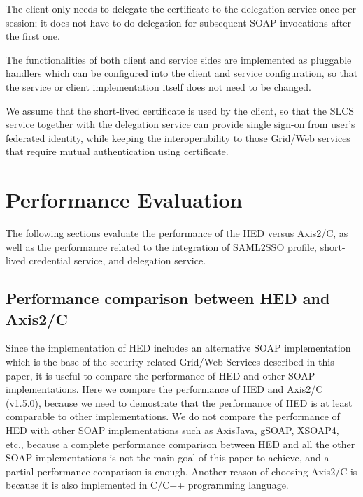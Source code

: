 \documentclass[conference]{IEEEtran}
\begin{document}
The client only needs to delegate the certificate to the delegation service once
per session; it does not have to do delegation for subsequent SOAP invocations after the first one.

The functionalities of both client and service sides are implemented as
pluggable handlers which can be configured into the client and service configuration, so that the service or
client implementation itself does not need to be changed.

We assume that the short-lived certificate is used by the client, so that the
SLCS service together with the delegation service can provide single sign-on from user's federated
identity, while keeping the interoperability to those Grid/Web services that require mutual authentication
using certificate.

\section{Performance Evaluation}
\label{sec:perfeval}
The following sections evaluate the performance of the HED versus Axis2/C, as 
well as the performance related to the integration of SAML2SSO profile, 
short-lived credential service, and delegation service.

\subsection{Performance comparison between HED and Axis2/C}
\label{sec:perhedandaxis}
Since the implementation of HED includes an alternative SOAP implementation
which is the base of the security related Grid/Web Services described in this paper, it is useful to
compare the performance of HED and other SOAP implementations. Here we compare 
the performance of HED and Axis2/C (v1.5.0), because we need to demostrate that the performance of HED
is at least comparable to other implementations. We do not compare the performance of HED 
with other SOAP implementations such as AxisJava, gSOAP, XSOAP4, etc., because a complete 
performance comparison between HED and all the other SOAP implementations is not the main 
goal of this paper to achieve, and a partial performance comparison is enough. Another reason
of choosing Axis2/C is because it is also implemented in C/C++ programming language.
\end{document}
